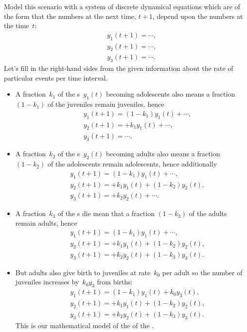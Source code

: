 Model this scenario with a system of discrete dynamical equations which are of the form that the numbers at the next time, \(t+1\), depend upon the numbers at the time~\(t\):
\begin{eqnarray*}&&
{y_1(t+1)}=\cdots,
\\&&{y_2(t+1)}=\cdots,
\\&&{y_3(t+1)}=\cdots.
\end{eqnarray*}
Let's fill in the right-hand sides from the given information about the rate of particular events per time interval.
\begin{itemize}
\item A fraction~\(k_1\) of the s~\(y_1(t)\) becoming adolescents also means a fraction \((1-k_1)\) of the juveniles remain juveniles, hence
\begin{eqnarray*}&&
{y_1(t+1)}=(1-k_1)y_1(t)+\cdots,
\\&&{y_2(t+1)}=+k_1y_1(t)+\cdots,
\\&&{y_3(t+1)}=\cdots.
\end{eqnarray*}
\item A fraction~\(k_2\) of the s~\(y_2(t)\) becoming adults also means a fraction \((1-k_2)\)  of the adolescents remain adolescents, hence additionally
\begin{eqnarray*}&&
{y_1(t+1)}=(1-k_1)y_1(t)+\cdots,
\\&&{y_2(t+1)}=+k_1y_1(t)+(1-k_2)y_2(t),
\\&&{y_3(t+1)}=+k_2y_2(t)+\cdots.
\end{eqnarray*}
\item A fraction~\(k_3\) of the s die mean that a fraction \((1-k_3)\) of the adults remain adults, hence
\begin{eqnarray*}&&
{y_1(t+1)}=(1-k_1)y_1(t)+\cdots,
\\&&{y_2(t+1)}=+k_1y_1(t)+(1-k_2)y_2(t),
\\&&{y_3(t+1)}=+k_2y_2(t)+(1-k_3)y_3(t).
\end{eqnarray*}
\item But adults also give birth to juveniles at rate~\(k_0\) per adult so the number of juveniles increases by~\(k_0y_3\) from births:
\begin{eqnarray*}&&
{y_1(t+1)}=(1-k_1)y_1(t)+k_0y_3(t),
\\&&{y_2(t+1)}=+k_1y_1(t)+(1-k_2)y_2(t),
\\&&{y_3(t+1)}=+k_2y_2(t)+(1-k_3)y_3(t).
\end{eqnarray*}
This is our mathematical model of the  of the .
\end{itemize}

